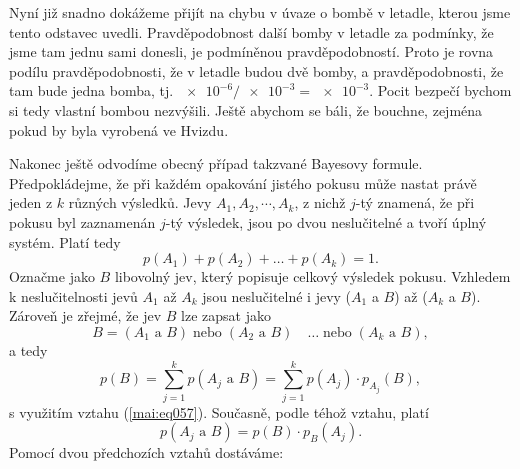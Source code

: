       Nyní již snadno dokážeme přijít na chybu v úvaze o bombě v letadle, kterou jsme tento 
      odstavec uvedli. Pravděpodobnost další bomby v letadle za podmínky, že jsme tam jednu sami 
      donesli, je podmíněnou pravděpodobností. Proto je rovna podílu pravděpodobnosti, že v letadle 
      budou dvě bomby, a pravděpodobnosti, že tam bude jedna bomba, tj. \(\num{e-6}/\num{e-3} = 
      \num{e-3}\). Pocit bezpečí bychom si tedy vlastní bombou nezvýšili. Ještě abychom se báli, že 
      bouchne, zejména pokud by byla vyrobená ve Hvizdu.
      
      
      
      
      
      Nakonec ještě odvodíme obecný případ takzvané Bayesovy formule. Předpokládejme, že při
      každém opakování jistého pokusu může nastat právě jeden z \(k\) různých výsledků. Jevy \(A_1,
      A_2,\cdots, A_k\), z nichž \(j\)-tý znamená, že při pokusu byl zaznamenán \(j\)-tý výsledek, 
      jsou po dvou neslučitelné a tvoří úplný systém. Platí tedy
      \begin{equation*}
        p(A_1) + p(A_2) + \ldots  + p(A_k) = 1.
      \end{equation*}
      Označme jako \(B\) libovolný jev, který popisuje celkový výsledek pokusu. Vzhledem k 
      neslučitelnosti jevů \(A_1\) až \(A_k\) jsou neslučitelné i jevy (\(A_1\) a \(B\)) až 
      (\(A_k\) a \(B\)). Zároveň je zřejmé, že jev \(B\) lze zapsat jako
     \begin{equation*}
       B = (A_1\text{ a }B)\;\text{nebo}\; (A_2\text{ a }B) \quad\ldots
       \;\text{nebo}\; (A_k\text{ a }B),
     \end{equation*} 
      a tedy
      \begin{equation*}
        p(B) = \sum_{j=1}^{k}p(A_j\text{ a }B) = \sum_{j=1}^{k}p(A_j)\cdot p_{A_j}(B),
      \end{equation*}
      s využitím vztahu (\ref{mai:eq057}). Současně, podle téhož vztahu, platí 
      \begin{equation*}
        p(A_j\text{ a }B) = p(B)\cdot  p_B(A_j).
      \end{equation*}
      Pomocí dvou předchozích vztahů dostáváme:
      
